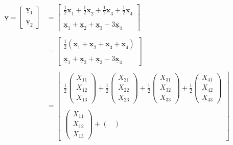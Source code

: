 \documentclass[
]{book}
\theoremstyle{definition}
\theoremstyle{definition}
\theoremstyle{definition}
\theoremstyle{definition}
\theoremstyle{remark}
\begin{document}
\begin{align*}
\underline{\mathbf{v}}=\begin{bmatrix}
\underline{\mathbf{v}}_1 \\ \\ \underline{\mathbf{v}}_2
\end{bmatrix}&=\begin{bmatrix}
\frac{1}{2}\underline{\mathbf{x}}_1+
\frac{1}{2}\underline{\mathbf{x}}_2+\frac{1}{2}\underline{\mathbf{x}}_3+\frac{1}{2}\underline{\mathbf{x}}_4 \\ \\
\underline{\mathbf{x}}_1+\underline{\mathbf{x}}_2+
\underline{\mathbf{x}}_3-3\underline{\mathbf{x}}_4
\end{bmatrix}\\ \\
&= \begin{bmatrix}
\frac{1}{2}(\underline{\mathbf{x}}_1+
\underline{\mathbf{x}}_2+\underline{\mathbf{x}}_3+
\underline{\mathbf{x}}_4) \\ \\
\underline{\mathbf{x}}_1+\underline{\mathbf{x}}_2+
\underline{\mathbf{x}}_3-3\underline{\mathbf{x}}_4
\end{bmatrix}\\ \\
&=\begin{bmatrix}
\frac{1}{2}\begin{pmatrix}
X_{11} \\ X_{12} \\ X_{13}
\end{pmatrix}+\frac{1}{2}
\begin{pmatrix}
X_{21} \\ X_{22} \\ X_{23}
\end{pmatrix}+\frac{1}{2}\begin{pmatrix}
X_{31} \\ X_{32} \\ X_{33}
\end{pmatrix}+\frac{1}{2}
\begin{pmatrix}
X_{41} \\ X_{42} \\ X_{43}
\end{pmatrix} \\ \\
\begin{pmatrix}
X_{11} \\ X_{12} \\ X_{13}
\end{pmatrix}+\begin{pmatrix}

\end{pmatrix}
\end{bmatrix}
\end{align*}
\end{document}
